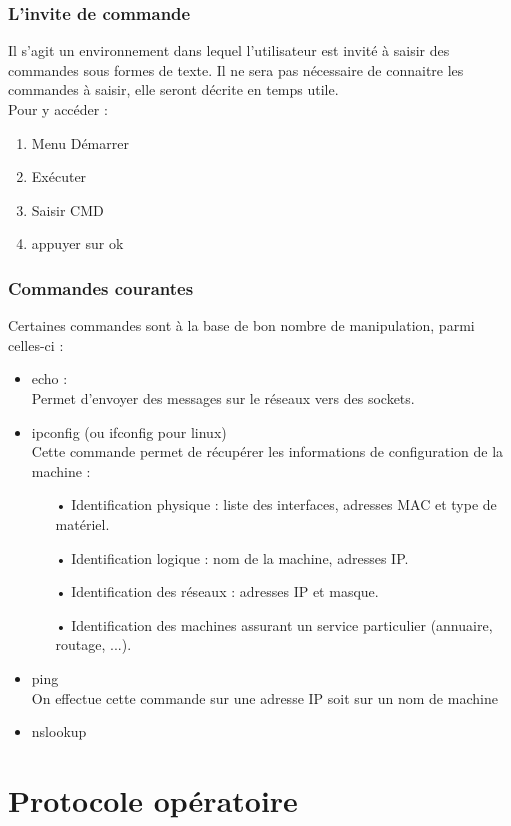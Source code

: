 \documentclass[a4paper]{article}
\begin{document}
\subsubsection{L'invite de commande}
Il s'agit un environnement dans lequel l'utilisateur est invité à saisir des commandes sous formes de texte.
Il ne sera pas nécessaire de connaitre les commandes à saisir, elle seront décrite en temps utile.\\
Pour y accéder :
\begin{enumerate}
	\item Menu Démarrer
	\item Exécuter
	\item Saisir CMD
	\item appuyer sur ok
\end{enumerate}
\subsubsection{Commandes courantes}
Certaines commandes sont à la base de bon nombre de manipulation, parmi celles-ci : 
\begin{itemize}
\item echo : \\
Permet d'envoyer des messages sur le réseaux vers des sockets.  
\item ipconfig (ou ifconfig pour linux)\\
Cette commande permet de récupérer les informations de configuration de la machine : \\
\begin{itemize}
\item[•]Identification physique : liste des interfaces, adresses MAC et type de matériel.
\item[•]Identification logique : nom de la machine, adresses IP.
\item[•]Identification des réseaux : adresses IP et masque.
\item[•]Identification des machines assurant un service particulier (annuaire, routage, ...).
\end{itemize}
\item ping \\
On effectue cette commande sur une adresse IP soit sur un nom de machine 
\item nslookup

\end{itemize}


\section{Protocole opératoire}
\end{document}
